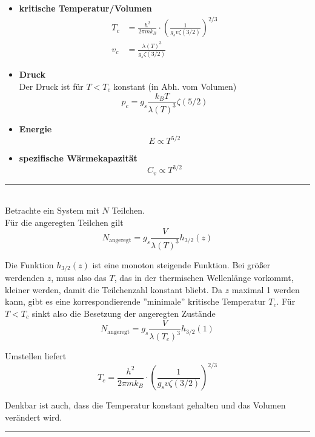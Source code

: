 \documentclass{article}
\newcommand{\lr}[1]{\left(#1\right)}
\begin{document}
	\begin{itemize}
		\item \textbf{kritische Temperatur/Volumen}
			\begin{align}
				T_c &= \frac{h^2}{2\pi m k_B} \cdot \lr{ \frac{1}{g_s v \zeta(3/2)} }^{2/3}\\
				v_c &= \frac{\lambda(T)^3}{g_s \zeta(3/2)}
			\end{align}
		
		
		\item \textbf{Druck}\\
		Der Druck ist für $T<T_c$ konstant (in Abh. vom Volumen)
			\begin{equation}
				p_c = g_s \frac{k_B T}{\lambda(T)^3} \zeta(5/2)
			\end{equation}
		
		
		\item \textbf{Energie}
			\begin{equation}
				E \propto T^{5/2}
			\end{equation}
		
		
		\item \textbf{spezifische Wärmekapazität}
			\begin{equation}
				C_v \propto T^{3/2}
			\end{equation}
	\end{itemize}

\vspace{0.5cm}

{\color{violet}
\hrule
	\\
	Betrachte ein System mit $N$ Teilchen.\\
	Für die angeregten Teilchen gilt
		$$N_{\text{angeregt}} = g_s\frac{V}{\lambda(T)^3} h_{3/2}(z)$$

	Die Funktion $h_{3/2}(z)$ ist eine monoton steigende Funktion. Bei größer werdenden $z$, muss also das $T$, das in der thermischen Wellenlänge vorkommt, kleiner werden, damit die Teilchenzahl konstant bliebt. Da $z$ maximal 1 werden kann, gibt es eine korrespondierende ''minimale'' kritische Temperatur $T_c$. Für $T<T_c$ sinkt also die Besetzung der angeregten Zustände
		$$N_{\text{angeregt}} = g_s \frac{V}{\lambda(T_c)^3} h_{3/2}(1)$$

	Umstellen liefert
		\begin{equation}
			T_c = \frac{h^2}{2\pi m k_B} \cdot \lr{ \frac{1}{g_s v \zeta(3/2)} }^{2/3}
		\end{equation}

	Denkbar ist auch, dass die Temperatur konstant gehalten und das Volumen verändert wird.
\hrule
}
\end{document}
